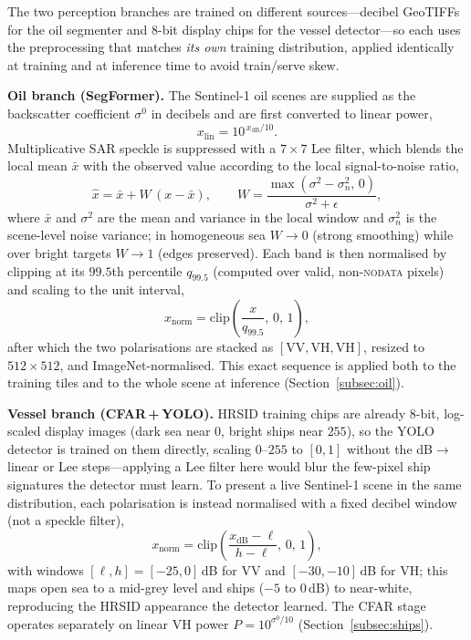 \documentclass[a4paper,11pt]{article}
\begin{document}
The two perception branches are trained on different sources---decibel GeoTIFFs for the
oil segmenter and 8-bit display chips for the vessel detector---so each uses the
preprocessing that matches \emph{its own} training distribution, applied identically at
training and at inference time to avoid train/serve skew.

\textbf{Oil branch (SegFormer).} The Sentinel-1 oil scenes are supplied as the
backscatter coefficient $\sigma^0$ in decibels and are first converted to linear power,
\begin{equation}
x_{\text{lin}} = 10^{\,x_{\text{dB}}/10}.
\end{equation}
Multiplicative SAR speckle is suppressed with a $7\times7$ Lee filter, which blends the
local mean $\bar{x}$ with the observed value according to the local signal-to-noise
ratio,
\begin{equation}
\hat{x} = \bar{x} + W\,(x - \bar{x}),
\qquad
W = \frac{\max(\sigma^2 - \sigma_n^2,\,0)}{\sigma^2 + \epsilon},
\end{equation}
where $\bar{x}$ and $\sigma^2$ are the mean and variance in the local window and
$\sigma_n^2$ is the scene-level noise variance; in homogeneous sea $W\!\to\!0$ (strong
smoothing) while over bright targets $W\!\to\!1$ (edges preserved). Each band is then
normalised by clipping at its $99.5$th percentile $q_{99.5}$ (computed over valid,
non-\textsc{nodata} pixels) and scaling to the unit interval,
\begin{equation}
x_{\text{norm}} = \mathrm{clip}\!\left(\frac{x}{q_{99.5}},\,0,\,1\right),
\end{equation}
after which the two polarisations are stacked as $[\text{VV},\text{VH},\text{VH}]$,
resized to $512\times512$, and ImageNet-normalised. This exact sequence is applied both
to the training tiles and to the whole scene at inference (Section~\ref{subsec:oil}).

\textbf{Vessel branch (CFAR\,+\,YOLO).} HRSID training chips are already 8-bit,
log-scaled display images (dark sea near $0$, bright ships near $255$), so the YOLO
detector is trained on them directly, scaling $0$--$255$ to $[0,1]$ without the
dB$\to$linear or Lee steps---applying a Lee filter here would blur the few-pixel ship
signatures the detector must learn. To present a live Sentinel-1 scene in the same
distribution, each polarisation is instead normalised with a fixed decibel window (not a
speckle filter),
\begin{equation}
x_{\text{norm}} = \mathrm{clip}\!\left(\frac{x_{\text{dB}} - \ell}{h - \ell},\,0,\,1\right),
\end{equation}
with windows $[\ell,h]=[-25,0]$\,dB for VV and $[-30,-10]$\,dB for VH; this maps open sea
to a mid-grey level and ships ($-5$ to $0$\,dB) to near-white,
reproducing the HRSID appearance the detector learned. The CFAR stage operates separately
on linear VH power $P=10^{\sigma^0/10}$ (Section~\ref{subsec:ships}).
\end{document}

